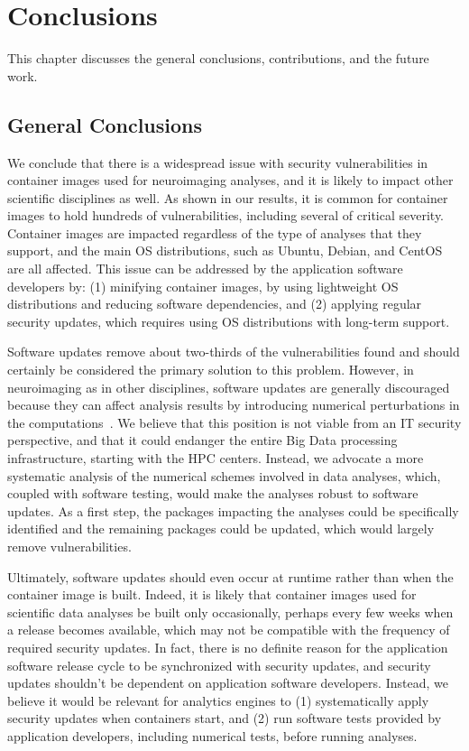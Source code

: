 \chapter{Conclusions}\label{chapter4}
This chapter discusses the general conclusions, contributions, 
and the future work.
\section{General Conclusions}

We conclude that there is a widespread issue with security vulnerabilities in container
images used for neuroimaging analyses, and it is likely to impact other
scientific disciplines as well. As shown in our results, it is common for container images
to hold hundreds of vulnerabilities, including several of critical
severity. Container images are impacted regardless of the type of analyses
that they support, and the main OS distributions, such as Ubuntu, Debian, and CentOS
are all affected. This issue can be addressed by the application software
developers by: (1) minifying container images, by using
lightweight OS distributions and reducing software dependencies,
and (2) applying regular security updates, which requires using OS
distributions with long-term support.

Software updates remove about two-thirds of the vulnerabilities found and
should certainly be considered the primary solution to this problem.
However, in neuroimaging as in other disciplines, software updates are
generally discouraged because they can affect analysis results by
introducing numerical perturbations in the
computations~\cite{gronenschild2012effects,glatard2015reproducibility}. We
believe that this position is not viable from an IT security perspective,
and that it could endanger the entire Big Data processing infrastructure,
starting with the HPC centers. Instead, we advocate a more systematic
analysis of the numerical schemes involved in data analyses, which, coupled
with software testing, would make the analyses robust to software updates.
As a first step, the packages impacting the analyses could be specifically
identified and the remaining packages could be updated, which would largely remove
vulnerabilities.

Ultimately, software updates should even occur at runtime rather than when
the container image is built. Indeed, it is likely that container images
used for scientific data analyses be built only occasionally, perhaps every
few weeks when a release becomes available, which may not be compatible
with the frequency of required security updates. In fact, there is no
definite reason for the application software release cycle to be
synchronized with security updates, and security updates shouldn't be
dependent on application software developers. Instead, we believe it would be
relevant for analytics engines to (1) systematically apply security updates
when containers start, and (2) run software tests provided by application
developers, including numerical tests, before running analyses.

